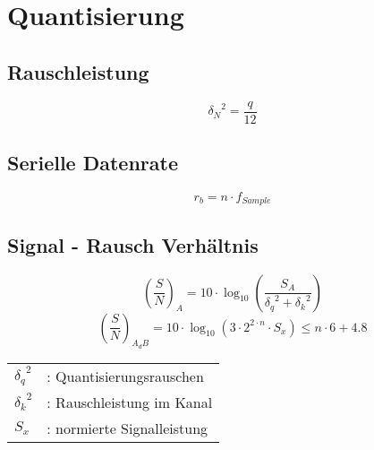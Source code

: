 \documentclass[a4paper, 10pt, fleqn]{article}
\begin{document}
\section{Quantisierung}
\subsection{Rauschleistung}
\[ {\delta_N}^2 = \frac{q}{12} \]

\subsection{Serielle Datenrate}
\[  r_b = n \cdot f_{Sample} \]

\subsection{Signal - Rausch Verhältnis}
\[ \left(\frac{S}{N}\right)_{A} = 
10 \cdot \log_{10} \left(\frac{S_A}{{\delta_q}^2 + {\delta_k}^2}\right) \]
\[ \left(\frac{S}{N}\right)_{A_dB} = 
10 \cdot \log_{10} \left(3 \cdot 2^{2 \cdot n} \cdot S_x\right) \leq n \cdot 6 + 4.8 \]
\begin{tabular}{@{}ll}
    ${\delta_q}^2$  & : Quantisierungsrauschen \\
    ${\delta_k}^2$  & : Rauschleistung im Kanal \\
    ${S_x}$         & : normierte Signalleistung \\
\end{tabular}
\end{document}
